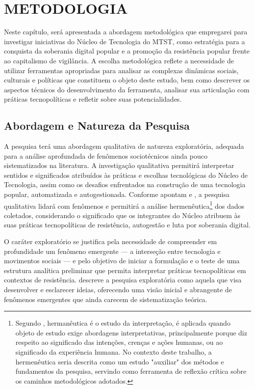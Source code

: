 
\chapter{METODOLOGIA}
\label{chap:metodologia}

Neste capítulo, será apresentada a abordagem metodológica que empregarei para investigar iniciativas do Núcleo de Tecnologia do MTST, como estratégia para a conquista da soberania digital popular e a promoção da resistência popular frente ao capitalismo de vigilância. A escolha metodológica reflete a necessidade de utilizar ferramentas apropriadas para analisar as complexas dinâmicas sociais, culturais e políticas que constituem o objeto deste estudo, bem como descrever os aspectos técnicos do desenvolvimento da ferramenta, analisar sua articulação com práticas tecnopolíticas e refletir sobre suas potencialidades.


\section{Abordagem e Natureza da Pesquisa}
A pesquisa terá uma abordagem qualitativa de natureza exploratória, adequada para a análise aprofundada de fenômenos sociotécnicos ainda pouco sistematizados na literatura. A investigação qualitativa permitirá interpretar sentidos e significados atribuídos às práticas e escolhas tecnológicas do Núcleo de Tecnologia, assim como os desafios enfrentados na construção de uma tecnologia popular, automatizada e autogestionada.
Conforme apontam  e , a pesquisa qualitativa lidará com fenômenos e permitirá a análise hermenêutica\footnote{Segundo , hermanêutica é o estudo da interpretação, é aplicada quando objeto de estudo exige abordagens interpretativas, principalmente porque diz respeito ao significado das intenções, crenças e ações humanas, ou ao significado da experiência humana. No contexto deste trabalho, a hermenêutica seria descrita como um estudo "auxiliar" dos métodos e fundamentos da pesquisa, servindo como ferramenta de reflexão crítica sobre os caminhos metodológicos adotados.} dos dados coletados, considerando o significado que os integrantes do Núcleo atribuem às suas práticas tecnopolíticas de resistência, autogestão e luta por soberania digital.


O caráter exploratório se justifica pela necessidade de compreender em profundidade um fenômeno emergente — a interseção entre tecnologia e movimentos sociais — e pelo objetivo de iniciar a formulação e o teste de uma estrutura analítica preliminar que permita interpretar práticas tecnopolíticas em contextos de resistência.  descreve a pesquisa exploratória como aquela que visa desenvolver e esclarecer ideias, oferecendo uma visão inicial e abrangente de fenômenos emergentes que ainda carecem de sistematização teórica.

